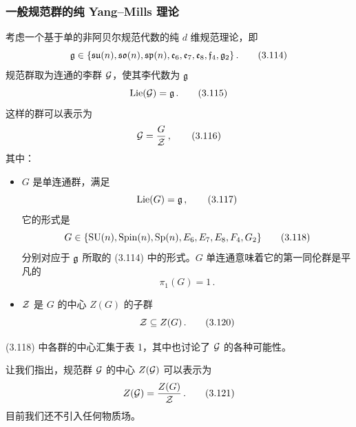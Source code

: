 
\subsubsection{一般规范群的纯 Yang--Mills 理论}

考虑一个基于单的非阿贝尔规范代数的纯 $d$ 维规范理论，即
\begin{equation}
    \mathfrak{g} \in \{\mathfrak{su}(n), \mathfrak{so}(n), \mathfrak{sp}(n), \mathfrak{e}_6, \mathfrak{e}_7, \mathfrak{e}_8, \mathfrak{f}_4, \mathfrak{g}_2\} \,.
    \tag{3.114}
\end{equation}
规范群取为连通的李群 $\mathcal{G}$，使其李代数为 $\mathfrak{g}$
\begin{equation}
    \mathrm{Lie}(\mathcal{G}) = \mathfrak{g} \,.
    \tag{3.115}
\end{equation}
这样的群可以表示为
\begin{equation}
    \mathcal{G} = \frac{G}{\mathcal{Z}} \,,
    \tag{3.116}
\end{equation}
其中：
\begin{itemize}[leftmargin=1.4em,itemsep=1pt,topsep=1pt]
\item $G$ 是单连通群，满足
\begin{equation}
    \mathrm{Lie}(G) = \mathfrak{g} \,,
    \tag{3.117}
\end{equation}
它的形式是
\begin{equation}
    G \in \{\mathrm{SU}(n), \mathrm{Spin}(n), \mathrm{Sp}(n), E_6, E_7, E_8, F_4, G_2\}
    \tag{3.118}
\end{equation}
分别对应于 $\mathfrak{g}$ 所取的 (3.114) 中的形式。$G$ 单连通意味着它的第一同伦群是平凡的
\begin{equation}
    \pi_1(G) = 1 \,.
    \tag{3.119}
\end{equation}
\item $\mathcal{Z}$ 是 $G$ 的中心 $Z(G)$ 的子群
\begin{equation}
    \mathcal{Z} \subseteq Z(G) \,.
    \tag{3.120}
\end{equation}
\end{itemize}
(3.118) 中各群的中心汇集于表 1，其中也讨论了 $\mathcal{G}$ 的各种可能性。


让我们指出，规范群 $\mathcal{G}$ 的中心 $Z(\mathcal{G})$ 可以表示为
\begin{equation}
    Z(\mathcal{G}) = \frac{Z(G)}{\mathcal{Z}} \,.
    \tag{3.121}
\end{equation}
目前我们还不引入任何物质场。


